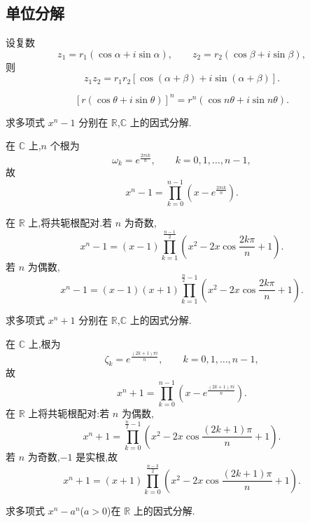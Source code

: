 \subsection{单位分解}

\begin{theorem}
设复数
\[
  z_1=r_1(\cos\alpha+i\sin\alpha),
  \qquad
  z_2=r_2(\cos\beta+i\sin\beta),
\]
则
\[
  z_1z_2=r_1r_2\left[\cos(\alpha+\beta)+i\sin(\alpha+\beta)\right].
\]
\end{theorem}

\begin{corollary}
\[
  \left[r(\cos\theta+i\sin\theta)\right]^n
  =r^n\left(\cos n\theta+i\sin n\theta\right).
\]
\end{corollary}

\begin{example}[\marktwostar]
求多项式 $x^n-1$ 分别在 $\mathbb{R}$,$\mathbb{C}$ 上的因式分解.
\end{example}
\exampleblank

\begin{solution}
在 $\mathbb{C}$ 上,$n$ 个根为
\[
  \omega_k=e^{\frac{2\pi ik}{n}},
  \qquad k=0,1,\ldots,n-1,
\]
故
\[
  x^n-1=\prod\limits_{k=0}^{n-1}
  \left(x-e^{\frac{2\pi ik}{n}}\right).
\]

在 $\mathbb{R}$ 上,将共轭根配对.若 $n$ 为奇数,
\[
  x^n-1=(x-1)
  \prod\limits_{k=1}^{\frac{n-1}{2}}
  \left(x^2-2x\cos\dfrac{2k\pi}{n}+1\right).
\]
若 $n$ 为偶数,
\[
  x^n-1=(x-1)(x+1)
  \prod\limits_{k=1}^{\frac n2-1}
  \left(x^2-2x\cos\dfrac{2k\pi}{n}+1\right).
\]
\end{solution}

\begin{example}
求多项式 $x^n+1$ 分别在 $\mathbb{R}$,$\mathbb{C}$ 上的因式分解.
\end{example}
\exampleblank

\begin{solution}
在 $\mathbb{C}$ 上,根为
\[
  \zeta_k=e^{\frac{(2k+1)\pi i}{n}},
  \qquad k=0,1,\ldots,n-1,
\]
故
\[
  x^n+1=\prod\limits_{k=0}^{n-1}
  \left(x-e^{\frac{(2k+1)\pi i}{n}}\right).
\]
在 $\mathbb{R}$ 上将共轭根配对:若 $n$ 为偶数,
\[
  x^n+1=
  \prod\limits_{k=0}^{\frac n2-1}
  \left(x^2-2x\cos\dfrac{(2k+1)\pi}{n}+1\right).
\]
若 $n$ 为奇数,$-1$ 是实根,故
\[
  x^n+1=(x+1)
  \prod\limits_{k=0}^{\frac{n-3}{2}}
  \left(x^2-2x\cos\dfrac{(2k+1)\pi}{n}+1\right).
\]
\end{solution}

\begin{example}
求多项式 $x^n-a^n$($a>0$)在 $\mathbb{R}$ 上的因式分解.
\end{example}
\exampleblank

